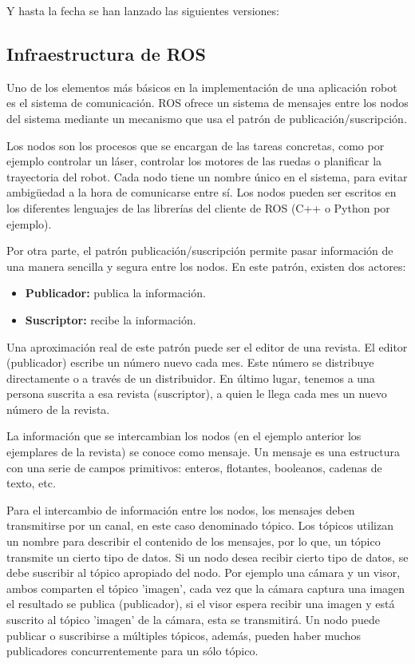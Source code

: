 Y hasta la fecha se han lanzado las siguientes versiones:



\subsection{Infraestructura de ROS}
Uno de los elementos más básicos en la implementación de una aplicación robot es
el sistema de comunicación. ROS ofrece un sistema de mensajes entre los nodos
del sistema mediante un mecanismo que usa el patrón de publicación/suscripción.

Los nodos son los procesos que se encargan de las tareas concretas, como por
ejemplo controlar un láser, controlar los motores de las ruedas o planificar la
trayectoria del robot. Cada nodo tiene un nombre único en el sistema, para
evitar ambigüedad a la hora de comunicarse entre sí. Los nodos pueden ser
escritos en los diferentes lenguajes de las librerías del cliente de ROS (C++ o
Python por ejemplo).

Por otra parte, el patrón publicación/suscripción permite pasar información de
una manera sencilla y segura entre los nodos. En este patrón, existen dos
actores:

\begin{itemize}
  \item \textbf{Publicador:} publica la información.
  \item \textbf{Suscriptor:} recibe la información.
\end{itemize}

Una aproximación real de este patrón puede ser el editor de una revista. El
editor (publicador) escribe un número nuevo cada mes. Este número se distribuye
directamente o a través de un distribuidor. En último lugar, tenemos a una
persona suscrita a esa revista (suscriptor), a quien le llega cada mes un nuevo
número de la revista.

La información que se intercambian los nodos (en el ejemplo anterior los
ejemplares de la revista) se conoce como mensaje. Un mensaje es una estructura
con una serie de campos primitivos: enteros, flotantes, booleanos, cadenas de
texto, etc.

Para el intercambio de información entre los nodos, los mensajes deben
transmitirse por un canal, en este caso denominado tópico. Los tópicos utilizan
un nombre para describir el contenido de los mensajes, por lo que, un tópico
transmite un cierto tipo de datos. Si un nodo desea recibir cierto tipo de
datos, se debe suscribir al tópico apropiado del nodo. Por ejemplo una cámara y
un visor, ambos comparten el tópico 'imagen', cada vez que la cámara captura una
imagen el resultado se publica (publicador), si el visor espera recibir una
imagen y está suscrito al tópico 'imagen' de la cámara, esta se transmitirá. Un
nodo puede publicar o suscribirse a múltiples tópicos, además, pueden haber
muchos publicadores concurrentemente para un sólo tópico.

